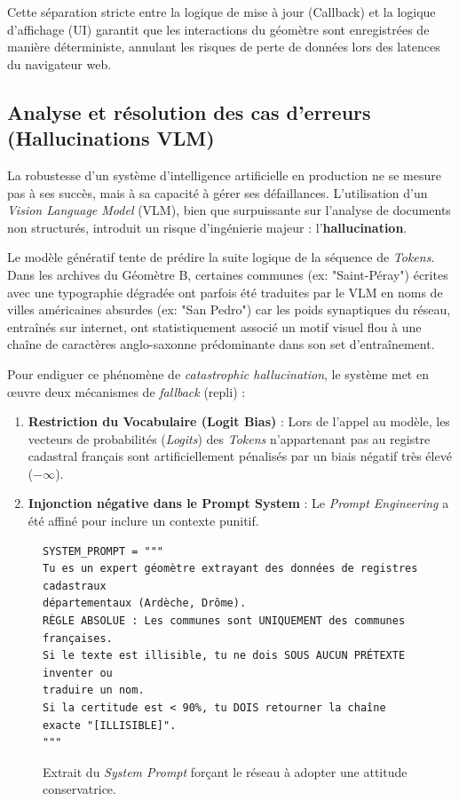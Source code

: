 Cette séparation stricte entre la logique de mise à jour (Callback) et la logique d'affichage (UI) garantit que les interactions du géomètre sont enregistrées de manière déterministe, annulant les risques de perte de données lors des latences du navigateur web.

\subsection{Analyse et résolution des cas d'erreurs (Hallucinations VLM)}

La robustesse d'un système d'intelligence artificielle en production ne se mesure pas à ses succès, mais à sa capacité à gérer ses défaillances. L'utilisation d'un \textit{Vision Language Model} (VLM), bien que surpuissante sur l'analyse de documents non structurés, introduit un risque d'ingénierie majeur : l'\textbf{hallucination}.

Le modèle génératif tente de prédire la suite logique de la séquence de \textit{Tokens}. Dans les archives du Géomètre B, certaines communes (ex: "Saint-Péray") écrites avec une typographie dégradée ont parfois été traduites par le VLM en noms de villes américaines absurdes (ex: "San Pedro") car les poids synaptiques du réseau, entraînés sur internet, ont statistiquement associé un motif visuel flou à une chaîne de caractères anglo-saxonne prédominante dans son set d'entraînement.

Pour endiguer ce phénomène de \textit{catastrophic hallucination}, le système met en œuvre deux mécanismes de \textit{fallback} (repli) :
\begin{enumerate}
    \item \textbf{Restriction du Vocabulaire (Logit Bias)} : Lors de l'appel au modèle, les vecteurs de probabilités (\textit{Logits}) des \textit{Tokens} n'appartenant pas au registre cadastral français sont artificiellement pénalisés par un biais négatif très élevé ($-\infty$).
    \item \textbf{Injonction négative dans le Prompt System} : Le \textit{Prompt Engineering} a été affiné pour inclure un contexte punitif.
\end{enumerate}

\begin{figure}[H]
\begin{verbatim}
SYSTEM_PROMPT = """
Tu es un expert géomètre extrayant des données de registres cadastraux 
départementaux (Ardèche, Drôme).
RÈGLE ABSOLUE : Les communes sont UNIQUEMENT des communes françaises. 
Si le texte est illisible, tu ne dois SOUS AUCUN PRÉTEXTE inventer ou 
traduire un nom. 
Si la certitude est < 90%, tu DOIS retourner la chaîne exacte "[ILLISIBLE]".
"""
\end{verbatim}
\caption{Extrait du \textit{System Prompt} forçant le réseau à adopter une attitude conservatrice.}
\end{figure}

